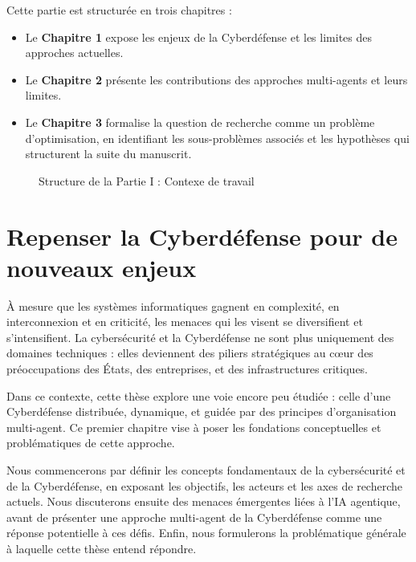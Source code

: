 \vspace{1em}

Cette partie est structurée en trois chapitres :
\begin{itemize}
    \item Le \textbf{Chapitre 1} expose les enjeux de la Cyberdéfense et les limites des approches actuelles.
    \item Le \textbf{Chapitre 2} présente les contributions des approches multi-agents et leurs limites.
    \item Le \textbf{Chapitre 3} formalise la question de recherche comme un problème d'optimisation, en identifiant les sous-problèmes associés et les hypothèses qui structurent la suite du manuscrit.
\end{itemize}
\clearpage

\begin{figure}[h!]
    \centering
    \resizebox{\textwidth}{!}{%
        
    }
    \caption{Structure de la Partie I : Contexe de travail}
    \label{fig:organisation_manuscrit_partie_1}
\end{figure}


\chapter{Repenser la Cyberdéfense pour de nouveaux enjeux}

\noindent
À mesure que les systèmes informatiques gagnent en complexité, en interconnexion et en criticité, les menaces qui les visent se diversifient et s'intensifient. La cybersécurité et la Cyberdéfense ne sont plus uniquement des domaines techniques : elles deviennent des piliers stratégiques au cœur des préoccupations des États, des entreprises, et des infrastructures critiques.

Dans ce contexte, cette thèse explore une voie encore peu étudiée : celle d'une Cyberdéfense distribuée, dynamique, et guidée par des principes d'organisation multi-agent. Ce premier chapitre vise à poser les fondations conceptuelles et problématiques de cette approche.

Nous commencerons par définir les concepts fondamentaux de la cybersécurité et de la Cyberdéfense, en exposant les objectifs, les acteurs et les axes de recherche actuels. Nous discuterons ensuite des menaces émergentes liées à l'\ac{IA} agentique, avant de présenter une approche multi-agent de la Cyberdéfense comme une réponse potentielle à ces défis. Enfin, nous formulerons la problématique générale à laquelle cette thèse entend répondre.

